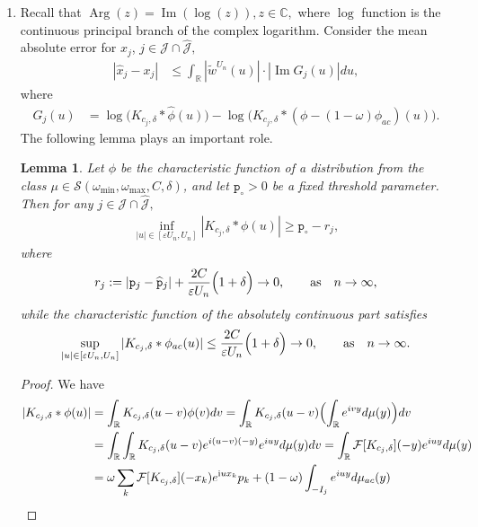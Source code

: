 \documentclass[numbers,webpdf,imaiai]{ima-authoring-template}%
\theoremstyle{thmstyletwo}%
\newtheorem{lemma}{Lemma}%
\newcommand{\R}{\mathbb{R}}
\newcommand{\C}{\mathbb{C}}
\newcommand{\F}{\mathcal{F}}
\renewcommand{\i}{\mathrm{i}}
\newcommand{\p}{\mathtt{p}}
\newcommand{\w}{\omega}
\newcommand{\eps}{\varepsilon}
\newcommand{\mJ}{\mathcal{J}}
\newcommand{\Arg}{\operatorname{Arg}}
\renewcommand{\Im}{\operatorname{Im}}
\numberwithin{equation}{section}
\begin{document}
\begin{enumerate}
\item Recall that \(\Arg(z)=\Im(\log(z)), z \in \C,\) where \(\log\) function is the continuous principal branch of the complex logarithm. Consider the mean absolute error for $x_j$, \(j \in \mJ \cap \widehat{\mJ},\)
\begin{align}\label{xj}
    |\widehat{x}_j - x_j| &\leq
   \int_{\R} | \widetilde{w}^{U_n} (u) | \cdot
| \Im G_j(u) |
 du,
\end{align}
where 
\begin{align}\label{Gj}
    G_j(u)  &=
 \log\bigl( K_{c_j,\delta} * \widehat{\phi}(u)\bigr)  -  \log \bigl(K_{c_j,\delta} * (\phi - (1-\w)\phi_{ac})(u)\bigr).
 \end{align} 
 The following lemma plays an important role. 
\begin{lemma}\label{lem5}
Let \(\phi\) be the characteristic function of a distribution from the class $\mu \in \mathcal{S}(\w_{\min}, \w_{\max}, C, \delta)$, and let \(\p_\circ>0\) be a fixed threshold parameter. Then for any \(j \in \mJ \cap \widehat{\mJ},\)
\begin{align}\label{lem51}
\inf_{|u| \in [\eps U_n, U_n]}|K_{c_j,\delta} * \phi(u)| \geq \p_\circ - r_j,
\end{align}
where 
\begin{align*}
r_j:=| \p_j  - \widehat{\p}_j| + \frac{2C}{\varepsilon U_n} \Bigl(1 +  \delta \Bigr)\to 0, \qquad \mbox{as}\quad n \to \infty,\end{align*}
while the characteristic function of the absolutely continuous part satisfies 
\begin{align}\label{lem52}
\sup_{|u| \in [\eps U_n, U_n]}|K_{c_j,\delta} * \phi_{ac}(u)|  \leq 
\frac{2C}{\varepsilon U_n} \Bigl(1 +  \delta \Bigr) \to 0,\qquad \mbox{as}\quad n \to \infty.
\end{align}
\end{lemma}
\begin{proof} 
We have
\begin{align*}
   |K_{c_j,\delta} * \phi(u)| &= \int_{\R} K_{c_j,\delta}(u - v)\phi(v)dv = \int_{\R} K_{c_j,\delta}(u - v)\Bigl( \int_\R e^{ivy} d \mu(y) \Bigr) dv \\ 
    &= \int_{\R} \int_{\R} K_{c_j,\delta}(u-v) e^{i(u - v)(-y)} e^{iuy} d \mu (y) dv= \int_{\R} \F[K_{c_j,\delta}](-y) e^{iuy} d \mu (y)  \\
    &= \w \sum_{k} \F[K_{c_j,\delta}](-x_k) e^{\i u x_k} p_k + (1 - \w) \int_{-I_j}  e^{iuy} d \mu_{ac} (y) \\

\end{align*}
\end{proof}
\end{enumerate}
\end{document}
